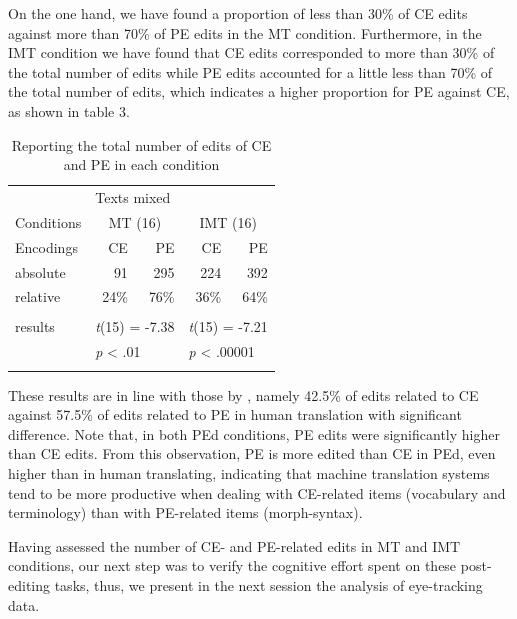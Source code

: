 \documentclass[output=paper]{langsci/langscibook}
\begin{document}
On the one hand, we have found a proportion of less than 30\% of CE edits against more than 70\% of PE edits in the MT condition. Furthermore, in the IMT condition we have found that CE edits corresponded to more than 30\% of the total number of edits while PE edits accounted for a little less than 70\% of the total number of edits, which indicates a higher proportion for PE against CE, as shown in table 3. 

\begin{table}
\begin{tabular}{lrrrr}
\lsptoprule
~ & \multicolumn{4}{l}{Texts mixed}\\
Conditions & \multicolumn{2}{c}{MT (16)} & \multicolumn{2}{c}{IMT (16)}\\
Encodings & {CE } & PE & {CE } & PE\\
\midrule
absolute & {91} & 295 & {224} & 392\\
relative & {24\%} & 76\% & {36\%} & 64\%\\\\
results & \multicolumn{2}{l}{\textit{t}(15) = -7.38} & \multicolumn{2}{l}{\textit{t}(15) = -7.21}\\
~ & \multicolumn{2}{l}{\textit{p} {\textless} .01} & \multicolumn{2}{l}{\textit{p} {\textless} .00001}\\
\lspbottomrule
\end{tabular}
\caption{Reporting the total number of edits of CE and PE in each condition}
\label{sarto:tab:3}
\end{table}


These results are in line with those by \citet{alves2013}, namely 42.5\% of edits related to CE against 57.5\% of edits related to PE in human translation with significant difference. Note that, in both PEd conditions, PE edits were significantly higher than CE edits. From this observation, PE is more edited than CE in PEd, even higher than in human translating, indicating that machine translation systems tend to be more productive when dealing with CE-related items (vocabulary and terminology) than with PE-related items (morph-syntax).  



Having assessed the number of CE- and PE-related edits in MT and IMT conditions, our next step was to verify the cognitive effort spent on these post-editing tasks, thus, we present in the next session the analysis of eye-tracking data.
\end{document}

